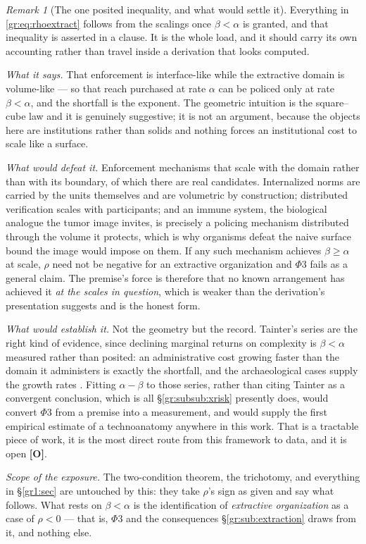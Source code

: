 \documentclass[11pt]{article}
\numberwithin{equation}{section}
\theoremstyle{plain}
\theoremstyle{definition}
\theoremstyle{remark}
\newtheorem{remark}[theorem]{Remark}
\begin{document}
\begin{remark}[The one posited inequality, and what would settle it]
\label{gr:rem:betaalpha}
Everything in \eqref{gr:eq:rhoextract} follows from the scalings once
$\beta<\alpha$ is granted, and that inequality is asserted in a clause.
It is the whole load, and it should carry its own accounting rather
than travel inside a derivation that looks computed.

\emph{What it says.} That enforcement is interface-like while the
extractive domain is volume-like --- so that reach purchased at rate
$\alpha$ can be policed only at rate $\beta<\alpha$, and the shortfall
is the exponent. The geometric intuition is the square--cube law and it
is genuinely suggestive; it is not an argument, because the objects
here are institutions rather than solids and nothing forces an
institutional cost to scale like a surface.

\emph{What would defeat it.} Enforcement mechanisms that scale with the
domain rather than with its boundary, of which there are real
candidates. Internalized norms are carried by the units themselves and
are volumetric by construction; distributed verification scales with
participants; and an immune system, the biological analogue the
tumor image invites, is precisely a policing mechanism distributed
through the volume it protects, which is why organisms defeat the naive
surface bound the image would impose on them. If any such mechanism
achieves $\beta\ge\alpha$ at scale, $\rho$ need not be negative for an
extractive organization and $\Phi3$ fails as a general claim. The
premise's force is therefore that no known arrangement has achieved it
\emph{at the scales in question}, which is weaker than the derivation's
presentation suggests and is the honest form.

\emph{What would establish it.} Not the geometry but the record.
Tainter's series are the right kind of evidence, since declining
marginal returns on complexity is $\beta<\alpha$ measured rather than
posited: an administrative cost growing faster than the domain it
administers is exactly the shortfall, and the archaeological cases
supply the growth rates \cite{Tainter88}. Fitting $\alpha-\beta$ to
those series, rather than citing Tainter as a convergent conclusion,
which is all \S\ref{gr:subsub:xrisk} presently does, would convert
$\Phi3$ from a premise into a measurement, and would supply the first
empirical estimate of a technoanatomy anywhere in this work. That is a
tractable piece of work, it is the most direct route from this
framework to data, and it is open \textbf{[O]}.

\emph{Scope of the exposure.} The two-condition theorem, the
trichotomy, and everything in \S\ref{gr1:sec} are untouched by this:
they take $\rho$'s sign as given and say what follows. What rests on
$\beta<\alpha$ is the identification of \emph{extractive organization}
as a case of $\rho<0$ --- that is, $\Phi3$ and the consequences
\S\ref{gr:sub:extraction} draws from it, and nothing else.
\end{remark}
\end{document}
